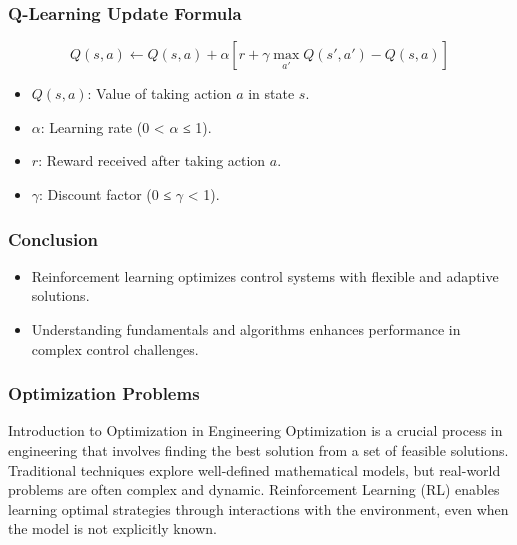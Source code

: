 \documentclass[aspectratio=169]{beamer}
\begin{document}
\begin{frame}[fragile]
    \frametitle{Q-Learning Update Formula}
    \begin{equation}
    Q(s, a) \leftarrow Q(s, a) + \alpha \left[ r + \gamma \max_{a'} Q(s', a') - Q(s, a) \right]
    \end{equation}
    \begin{itemize}
        \item $Q(s, a)$: Value of taking action $a$ in state $s$.
        \item $\alpha$: Learning rate (0 < $\alpha$ ≤ 1).
        \item $r$: Reward received after taking action $a$.
        \item $\gamma$: Discount factor (0 ≤ $\gamma$ < 1).
    \end{itemize}
\end{frame}

\begin{frame}[fragile]
    \frametitle{Conclusion}
    \begin{itemize}
        \item Reinforcement learning optimizes control systems with flexible and adaptive solutions.
        \item Understanding fundamentals and algorithms enhances performance in complex control challenges.
    \end{itemize}
\end{frame}

\begin{frame}[fragile]
  \frametitle{Optimization Problems}
  \begin{block}{Introduction to Optimization in Engineering}
    Optimization is a crucial process in engineering that involves finding the best solution from a set of feasible solutions. Traditional techniques explore well-defined mathematical models, but real-world problems are often complex and dynamic. Reinforcement Learning (RL) enables learning optimal strategies through interactions with the environment, even when the model is not explicitly known.
  \end{block}
\end{frame}
\end{document}
